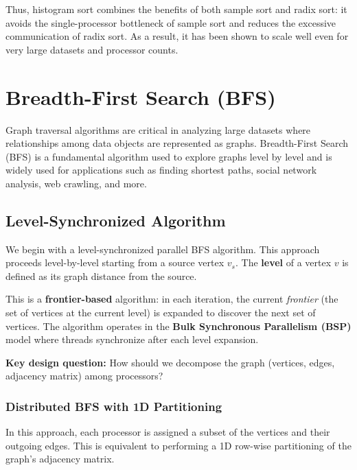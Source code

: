 \documentclass[12pt]{book}
\begin{document}
Thus, histogram sort combines the benefits of both sample sort and radix sort: it avoids the single-processor bottleneck of sample sort and reduces the excessive communication of radix sort. As a result, it has been shown to scale well even for very large datasets and processor counts.









\section{Breadth-First Search (BFS)}

Graph traversal algorithms are critical in analyzing large datasets where relationships among data objects are represented as graphs. Breadth-First Search (BFS) is a fundamental algorithm used to explore graphs level by level and is widely used for applications such as finding shortest paths, social network analysis, web crawling, and more.

\subsection{Level-Synchronized Algorithm}

We begin with a level-synchronized parallel BFS algorithm. This approach proceeds level-by-level starting from a source vertex $v_s$. The \textbf{level} of a vertex $v$ is defined as its graph distance from the source.

This is a \textbf{frontier-based} algorithm: in each iteration, the current \textit{frontier} (the set of vertices at the current level) is expanded to discover the next set of vertices. The algorithm operates in the \textbf{Bulk Synchronous Parallelism (BSP)} model where threads synchronize after each level expansion.

\medskip
\noindent
\textbf{Key design question:} How should we decompose the graph (vertices, edges, adjacency matrix) among processors?

\subsubsection{Distributed BFS with 1D Partitioning}

In this approach, each processor is assigned a subset of the vertices and their outgoing edges. This is equivalent to performing a 1D row-wise partitioning of the graph’s adjacency matrix.
\end{document}
